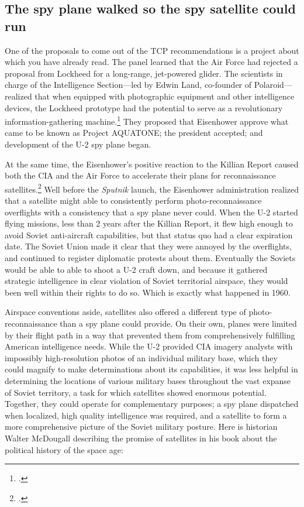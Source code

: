 \documentclass{report}
\begin{document}
\subsection{The spy plane walked so the spy satellite could run}
One of the proposals to come out of the TCP recommendations is a project about which you have already read. The panel learned that the Air Force had rejected a proposal from Lockheed for a long-range, jet-powered glider. The scientists in charge of the Intelligence Section---led by Edwin Land, co-founder of Polaroid---realized that when equipped with photographic equipment and other intelligence devices, the Lockheed prototype had the potential to serve as a revolutionary information-gathering machine.\footcite[p.~81-82]{killian_sputnik_1977} They proposed that Eisenhower approve what came to be known as Project AQUATONE; the president accepted; and development of the U-2 spy plane began.

At the same time, the Eisenhower's positive reaction to the Killian Report caused both the CIA and the Air Force to accelerate their plans for reconnaissance satellites.\footcite[p.~83]{killian_sputnik_1977} Well before the \emph{Sputnik} launch, the Eisenhower administration realized that a satellite might able to consistently perform photo-reconnaissance overflights with a consistency that a spy plane never could. When the U-2 started flying missions, less than 2 years after the Killian Report, it flew high enough to avoid Soviet anti-aircraft capabilities, but that status quo had a clear expiration date. The Soviet Union made it clear that they were annoyed by the overflights, and continued to register diplomatic protests about them. Eventually the Soviets would be able to able to shoot a U-2 craft down, and because it gathered strategic intelligence in clear violation of Soviet territorial airspace, they would been well within their rights to do so. Which is exactly what happened in 1960.

Airspace conventions aside, satellites also offered a different type of photo-reconnaissance than a spy plane could provide. On their own, planes were limited by their flight path in a way that prevented them from comprehensively fulfilling American intelligence needs. While the U-2 provided CIA imagery analysts with impossibly high-resolution photos of an individual military base, which they could magnify to make determinations about its capabilities, it was less helpful in determining the locations of various military bases throughout the vast expanse of Soviet territory, a task for which satellites showed enormous potential. Together, they could operate for complementary purposes; a spy plane dispatched when localized, high quality intelligence was required, and a satellite to form a more comprehensive picture of the Soviet military posture. Here is historian Walter McDougall describing the promise of satellites in his book about the political history of the space age:
\end{document}
